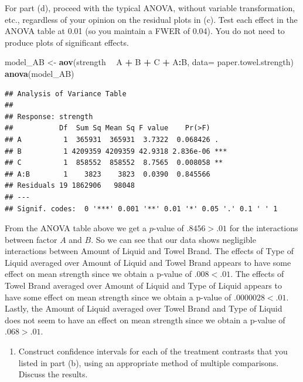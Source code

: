 \documentclass[12pt,]{article}
\newenvironment{Shaded}{\begin{snugshade}}{\end{snugshade}}
\newcommand{\KeywordTok}[1]{\textcolor[rgb]{0.13,0.29,0.53}{\textbf{#1}}}
\newcommand{\DataTypeTok}[1]{\textcolor[rgb]{0.13,0.29,0.53}{#1}}
\newcommand{\StringTok}[1]{\textcolor[rgb]{0.31,0.60,0.02}{#1}}
\newcommand{\OperatorTok}[1]{\textcolor[rgb]{0.81,0.36,0.00}{\textbf{#1}}}
\newcommand{\NormalTok}[1]{#1}
\providecommand{\tightlist}{%
  \setlength{\itemsep}{0pt}\setlength{\parskip}{0pt}}
\begin{document}
For part (d), proceed with the typical ANOVA, without variable
transformation, etc., regardless of your opinion on the residual plots
in (c). Test each effect in the ANOVA table at 0.01 (so you maintain a
FWER of 0.04). You do not need to produce plots of significant effects.

\begin{Shaded}
\begin{Highlighting}[]
\NormalTok{model_AB <-}\StringTok{ }\KeywordTok{aov}\NormalTok{(strength }\OperatorTok{~}\StringTok{ }\NormalTok{A }\OperatorTok{+}\StringTok{ }\NormalTok{B }\OperatorTok{+}\StringTok{ }\NormalTok{C }\OperatorTok{+}\StringTok{ }\NormalTok{A}\OperatorTok{:}\NormalTok{B, }\DataTypeTok{data=}\NormalTok{ paper.towel.strength)}
\KeywordTok{anova}\NormalTok{(model_AB)}
\end{Highlighting}
\end{Shaded}

\begin{verbatim}
## Analysis of Variance Table
## 
## Response: strength
##           Df  Sum Sq Mean Sq F value    Pr(>F)    
## A          1  365931  365931  3.7322  0.068426 .  
## B          1 4209359 4209359 42.9318 2.836e-06 ***
## C          1  858552  858552  8.7565  0.008058 ** 
## A:B        1    3823    3823  0.0390  0.845566    
## Residuals 19 1862906   98048                      
## ---
## Signif. codes:  0 '***' 0.001 '**' 0.01 '*' 0.05 '.' 0.1 ' ' 1
\end{verbatim}

From the ANOVA table above we get a \(p\)-value of \(.8456 > .01\) for
the interactions between factor \(A\) and \(B\). So we can see that our
data shows negligible interactions between Amount of Liquid and Towel
Brand. The effects of Type of Liquid averaged over Amount of Liquid and
Towel Brand appears to have some effect on mean strength since we obtain
a p-value of \(.008< .01\). The effects of Towel Brand averaged over
Amount of Liquid and Type of Liquid appears to have some effect on mean
strength since we obtain a p-value of \(.0000028< .01\). Lastly, the
Amount of Liquid averaged over Towel Brand and Type of Liquid does not
seem to have an effect on mean strength since we obtain a p-value of
\(.068 > .01\).

\begin{enumerate}
\def\labelenumi{(\alph{enumi})}
\setcounter{enumi}{4}
\tightlist
\item
  Construct confidence intervals for each of the treatment contrasts
  that you listed in part (b), using an appropriate method of multiple
  comparisons. Discuss the results.
\end{enumerate}
\end{document}
